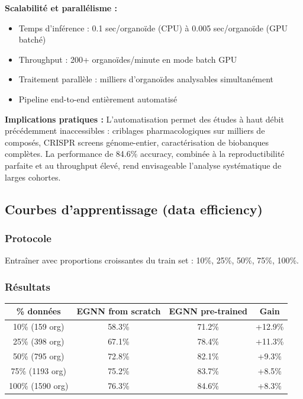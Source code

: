\textbf{Scalabilité et parallélisme :}
\begin{itemize}
    \item Temps d'inférence : 0.1 sec/organoïde (CPU) à 0.005 sec/organoïde (GPU batché)
    \item Throughput : 200+ organoïdes/minute en mode batch GPU
    \item Traitement parallèle : milliers d'organoïdes analysables simultanément
    \item Pipeline end-to-end entièrement automatisé
\end{itemize}

\textbf{Implications pratiques :}
L'automatisation permet des études à haut débit précédemment inaccessibles : criblages pharmacologiques sur milliers de composés, CRISPR screens génome-entier, caractérisation de biobanques complètes. La performance de 84.6\% accuracy, combinée à la reproductibilité parfaite et au throughput élevé, rend envisageable l'analyse systématique de larges cohortes.


\subsection{Courbes d'apprentissage (data efficiency)}

\subsubsection{Protocole}

Entraîner avec proportions croissantes du train set : 10\%, 25\%, 50\%, 75\%, 100\%.

\subsubsection{Résultats}

\begin{center}
\begin{tabular}{|c|c|c|c|}
\hline
\textbf{\% données} & \textbf{EGNN from scratch} & \textbf{EGNN pre-trained} & \textbf{Gain} \\
\hline
10\% (159 org) & 58.3\% & 71.2\% & +12.9\% \\
25\% (398 org) & 67.1\% & 78.4\% & +11.3\% \\
50\% (795 org) & 72.8\% & 82.1\% & +9.3\% \\
75\% (1193 org) & 75.2\% & 83.7\% & +8.5\% \\
100\% (1590 org) & 76.3\% & 84.6\% & +8.3\% \\
\hline
\end{tabular}
\end{center}

